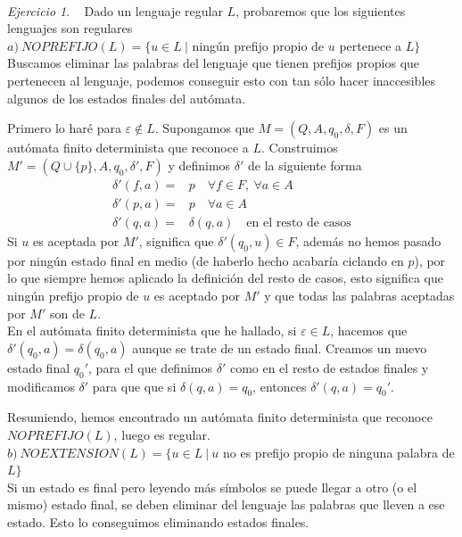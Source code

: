 \documentclass[12pt,spanish]{article}
\theoremstyle{definition}
\theoremstyle{remark}
\newtheorem{exercise}{Ejercicio}%
\begin{document}
~

\begin{exercise}~ Dado un lenguaje regular $L$, probaremos que los
  siguientes lenguajes son regulares \\
  
  $a) \ NOPREFIJO(L)=\{u\in L \ |$ ningún prefijo propio de $u$ pertenece a $L\}$ \\

  Buscamos eliminar las palabras del lenguaje que tienen prefijos
  propios que pertenecen al lenguaje, podemos conseguir esto con tan
  sólo hacer inaccesibles algunos de los estados finales del autómata.

  Primero lo haré para $\varepsilon \notin L$.
  Supongamos que $M=(Q,A,q_0,\delta,F)$ es un autómata finito
  determinista que reconoce a $L$. Construimos
  $M'=(Q\cup\{p\},A,q_0,\delta',F)$ y definimos $\delta'$ de la
  siguiente forma
  \begin{align*}
    \delta'(f,a)=&p \quad \forall f \in F, \ \forall a \in A \\
    \delta'(p,a)=&p \quad \forall a \in A \\
    \delta'(q,a)=&\delta(q,a) \quad \text{en el resto de casos}
  \end{align*}
  Si $u$ es aceptada por $M'$, significa que $\delta'(q_0,u) \in F$,
  además no hemos pasado por ningún estado final en medio (de haberlo
  hecho acabaría ciclando en $p$), por lo que siempre hemos aplicado
  la definición del resto de casos, esto significa que ningún prefijo
  propio de $u$ es aceptado por $M'$ y que todas las palabras
  aceptadas por $M'$ son de $L$. \\

  En el autómata finito determinista que he hallado, si
  $\varepsilon \in L$, hacemos que $\delta'(q_0,a)=\delta(q_0,a)$
  aunque se trate de un estado final. Creamos un nuevo estado final
  $q_0'$, para el que definimos $\delta'$ como en el resto de estados
  finales y modificamos $\delta'$ para que que si $\delta(q,a)=q_0$,
  entonces $\delta'(q,a)=q_0'$.

  Resumiendo, hemos encontrado un autómata finito determinista que
  reconoce $NOPREFIJO(L)$, luego es regular. \\

$b) \ NOEXTENSION(L)=\{u\in L \ | \ u$ no es prefijo propio de ninguna
palabra de $L\}$ \\

  Si un estado es final pero leyendo más símbolos se puede llegar a
otro (o el mismo) estado final, se deben eliminar del lenguaje las
palabras que lleven a ese estado. Esto lo conseguimos eliminando
estados finales.


\end{exercise}
\end{document}
